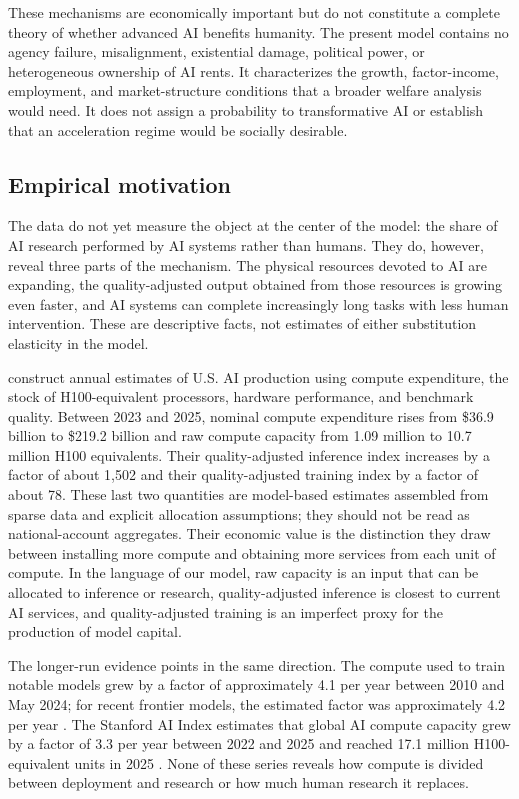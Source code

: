 These mechanisms are economically important but do not constitute a complete theory
of whether advanced AI benefits humanity. The present model contains no agency
failure, misalignment, existential damage, political power, or heterogeneous
ownership of AI rents. It characterizes the growth, factor-income, employment, and
market-structure conditions that a broader welfare analysis would need. It does not
assign a probability to transformative AI or establish that an acceleration regime
would be socially desirable.

\subsection{Empirical motivation}

The data do not yet measure the object at the center of the model: the share of AI
research performed by AI systems rather than humans. They do, however, reveal three
parts of the mechanism. The physical resources devoted to AI are expanding, the
quality-adjusted output obtained from those resources is growing even faster, and AI
systems can complete increasingly long tasks with less human intervention. These are
descriptive facts, not estimates of either substitution elasticity in the model.

\citet{korinekmckelvey2026} construct annual estimates of U.S. AI production using
compute expenditure, the stock of H100-equivalent processors, hardware performance,
and benchmark quality. Between 2023 and 2025, nominal compute expenditure rises from
\$36.9 billion to \$219.2 billion and raw compute capacity from 1.09 million to 10.7
million H100 equivalents. Their quality-adjusted inference index increases by a
factor of about 1,502 and their quality-adjusted training index by a factor of about
78. These last two quantities are model-based estimates assembled from sparse data
and explicit allocation assumptions; they should not be read as national-account
aggregates. Their economic value is the distinction they draw between installing
more compute and obtaining more services from each unit of compute. In the language
of our model, raw capacity is an input that can be allocated to inference or
research, quality-adjusted inference is closest to current AI services, and
quality-adjusted training is an imperfect proxy for the production of model capital.

The longer-run evidence points in the same direction. The compute used to train
notable models grew by a factor of approximately 4.1 per year between 2010 and May
2024; for recent frontier models, the estimated factor was approximately 4.2 per
year \citep{sevillaroldan2024}. The Stanford AI Index estimates that global AI
compute capacity grew by a factor of 3.3 per year between 2022 and 2025 and reached
17.1 million H100-equivalent units in 2025 \citep{stanfordaiindex2026}. None of these
series reveals how compute is divided between deployment and research or how much
human research it replaces.

